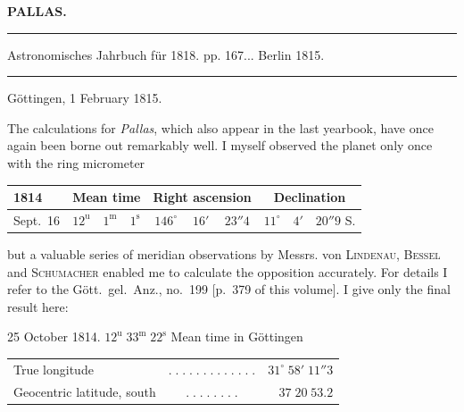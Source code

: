 \clearpage{}\hypertarget{native-388-lower}{}\label{native-388-lower}
\begin{center}\textbf{PALLAS.}\par\vspace{4pt}\hrule\vspace{4pt}\fontsize{10}{12}\selectfont Astronomisches Jahrbuch für 1818. pp. 167\;... Berlin 1815.\par\vspace{4pt}\hrule\vspace{4pt}\end{center}

\begin{flushright}
Göttingen, 1 February 1815.
\end{flushright}

\par\indent The calculations for \emph{Pallas}, which also appear in the last yearbook, have once again been borne out remarkably well. I myself observed the planet only once with the ring micrometer

\begin{center}
\fontsize{9}{11}\selectfont\setlength{\tabcolsep}{3pt}\renewcommand{\arraystretch}{1.15}\begin{tabular}{l|ccc|ccc|ccc}
1814 & \multicolumn{3}{c|}{Mean time} & \multicolumn{3}{c|}{Right ascension} & \multicolumn{3}{c}{Declination} \\
\hline
Sept.\ 16 & $12^{\mathrm u}$ & $1^{\mathrm m}$ & $1^{\mathrm s}$ & $146^\circ$ & $16'$ & $23''4$ & $11^\circ$ & $4'$ & $20''9$ S. \\
\end{tabular}
\end{center}

\noindent but a valuable series of meridian observations by Messrs. von \textsc{Lindenau}, \textsc{Bessel} and \textsc{Schumacher} enabled me to calculate the opposition accurately. For details I refer to the Gött.\ gel.\ Anz., no.\ 199 [p.\ 379 of this volume]. I give only the final result here:

\begin{center}25 October 1814. $12^{\mathrm u}\;33^{\mathrm m}\;22^{\mathrm s}$ Mean time in Göttingen\end{center}
\begin{center}\fontsize{10}{12}\selectfont\setlength{\tabcolsep}{3pt}\renewcommand{\arraystretch}{1.15}\begin{tabular}{lcr}
True longitude & $.\;.\;.\;.\;.\;.\;.\;.\;.\;.\;.\;.\;.$ & $31^\circ\;58'\;11''3$\\
Geocentric latitude, south & $.\;.\;.\;.\;.\;.\;.\;.$ & $37\;20\;53.2$\\
\end{tabular}\end{center}

